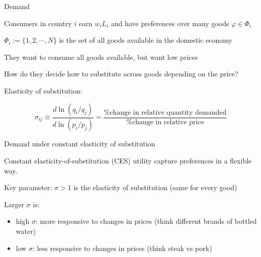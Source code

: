 \documentclass[notes,11pt, aspectratio=169, xcolor=table]{beamer}
\newenvironment{wideitemize}{\itemize\addtolength{\itemsep}{10pt}}{\enditemize}
\begin{document}
\begin{frame}{Demand}
    \begin{wideitemize}
        \item Consumers in country $i$ earn $w_iL_i$ and have preferences over many goods $\varphi \in \Phi_i$ 
        \item $\Phi_i := \{1,2,\cdots, N\}$ is the set of all goods available in the domestic economy
        \item They want to consume all goods available, but want low prices

        \item How do they decide how to substitute across goods depending on the price?

        \item Elasticity of substitution:

        \begin{equation*}
            \sigma_{ij} \equiv \frac{d \ln (q_i/q_j)}{d \ln (p_i/p_j)} = \frac{\text{\% change in relative quantity demanded}}{\text{\% change in relative price}}
        \end{equation*}

    \end{wideitemize}    
\end{frame}

\begin{frame}{Demand under constant elasticity of substitution}

\begin{wideitemize}
            \item Constant elasticity-of-substitution (CES) utility capture preferences in a flexible way.

            \item Key parameter:  $\sigma > 1$ is the elasticity of substitution (same for every good)
            
            \item Larger $\sigma$ is:
            \begin{itemize}
                \item high $\sigma$: more responsive to changes in prices (think different brands of bottled water) 
                \item low $\sigma$: less responsive to changes in prices (think steak vs pork)
            \end{itemize}


\end{wideitemize}
    
\end{frame}
\end{document}
